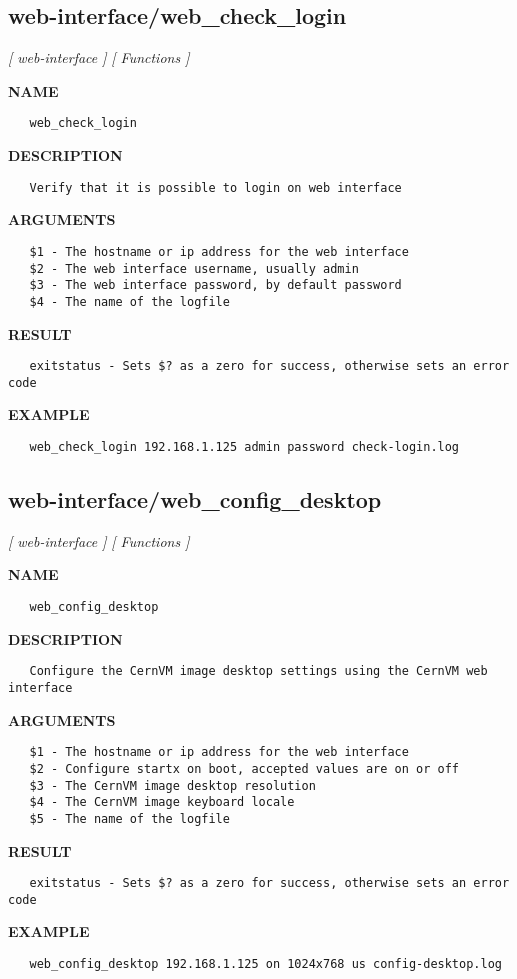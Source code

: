 \subsection{web-interface/web\_check\_login}
\textsl{[ web-interface ]}
\textsl{[ Functions ]}

\label{ch:robo71}
\label{ch:web_interface_web_check_login}
\textbf{NAME}
\begin{verbatim}
   web_check_login
\end{verbatim}
\textbf{DESCRIPTION}
\begin{verbatim}
   Verify that it is possible to login on web interface
\end{verbatim}
\textbf{ARGUMENTS}
\begin{verbatim}
   $1 - The hostname or ip address for the web interface
   $2 - The web interface username, usually admin
   $3 - The web interface password, by default password
   $4 - The name of the logfile
\end{verbatim}
\textbf{RESULT}
\begin{verbatim}
   exitstatus - Sets $? as a zero for success, otherwise sets an error code
\end{verbatim}
\textbf{EXAMPLE}
\begin{verbatim}
   web_check_login 192.168.1.125 admin password check-login.log
\end{verbatim}
\newpage
\subsection{web-interface/web\_config\_desktop}
\textsl{[ web-interface ]}
\textsl{[ Functions ]}

\label{ch:robo72}
\label{ch:web_interface_web_config_desktop}
\textbf{NAME}
\begin{verbatim}
   web_config_desktop
\end{verbatim}
\textbf{DESCRIPTION}
\begin{verbatim}
   Configure the CernVM image desktop settings using the CernVM web interface
\end{verbatim}
\textbf{ARGUMENTS}
\begin{verbatim}
   $1 - The hostname or ip address for the web interface
   $2 - Configure startx on boot, accepted values are on or off
   $3 - The CernVM image desktop resolution
   $4 - The CernVM image keyboard locale
   $5 - The name of the logfile
\end{verbatim}
\textbf{RESULT}
\begin{verbatim}
   exitstatus - Sets $? as a zero for success, otherwise sets an error code
\end{verbatim}
\textbf{EXAMPLE}
\begin{verbatim}
   web_config_desktop 192.168.1.125 on 1024x768 us config-desktop.log
\end{verbatim}
\newpage
